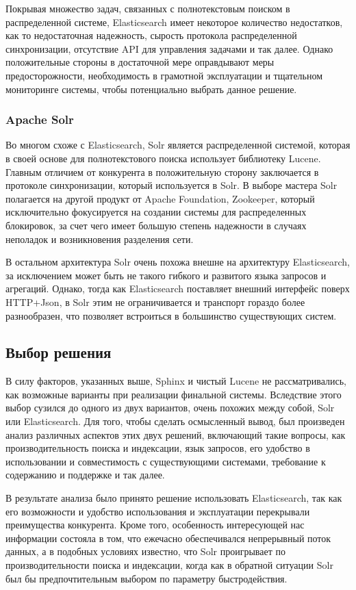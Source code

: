 Покрывая множество задач, связанных с полнотекстовым поиском в распределенной системе, Elasticsearch имеет некоторое количество недостатков, как то недостаточная надежность, сырость протокола распределенной синхронизации, отсутствие API для управления задачами и так далее. Однако положительные стороны в достаточной мере оправдывают меры предосторожности, необходимость в грамотной эксплуатации и тщательном мониторинге системы, чтобы потенциально выбрать данное решение.

\subsubsection{Apache Solr}

Во многом схоже с Elasticsearch, Solr является распределенной системой, которая в своей основе для полнотекстового поиска использует библиотеку Lucene. Главным отличием от конкурента в положительную сторону заключается в протоколе синхронизации, который используется в Solr. В выборе мастера Solr полагается на другой продукт от Apache Foundation, Zookeeper, который исключительно фокусируется на создании системы для распределенных блокировок, за счет чего имеет большую степень надежности в случаях неполадок и возникновения разделения сети.

В остальном архитектура Solr очень похожа внешне на архитектуру Elasticsearch, за исключением может быть не такого гибкого и развитого языка запросов и агрегаций. Однако, тогда как Elasticsearch поставляет внешний интерфейс поверх HTTP+Json, в Solr этим не ограничивается и транспорт гораздо более разнообразен, что позволяет встроиться в большинство существующих систем.

\subsection{Выбор решения}

В силу факторов, указанных выше, Sphinx и чистый Lucene не рассматривались, как возможные варианты при реализации финальной системы. Вследствие этого выбор сузился до одного из двух вариантов, очень похожих между собой, Solr или Elasticsearch. Для того, чтобы сделать осмысленный вывод, был произведен анализ различных аспектов этих двух решений, включающий такие вопросы, как производительность поиска и индексации, язык запросов, его удобство в использовании и совместимость с существующими системами, требование к содержанию и поддержке и так далее.

В результате анализа было принято решение использовать Elasticsearch, так как его возможности и удобство использования и эксплуатации перекрывали преимущества конкурента. Кроме того, особенность интересующей нас информации состояла в том, что ежечасно обеспечивался непрерывный поток данных, а в подобных условиях известно, что Solr проигрывает по производительности поиска и индексации, когда как в обратной ситуации Solr был бы предпочтительным выбором по параметру быстродействия.

\clearpage
